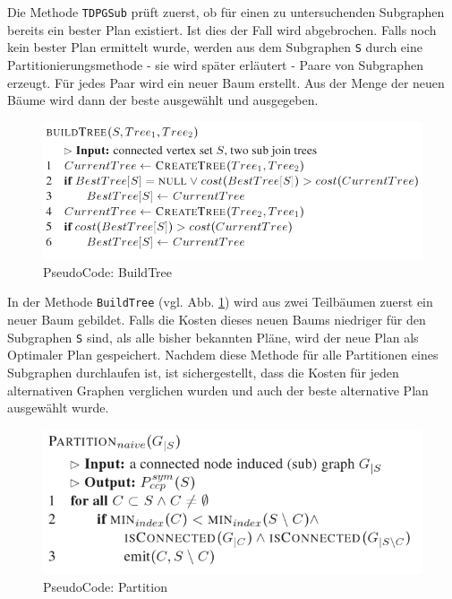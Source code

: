 Die Methode \texttt{TDPGSub} prüft zuerst, ob für einen zu untersuchenden Subgraphen bereits ein bester Plan existiert. Ist dies der Fall wird abgebrochen. Falls noch kein bester Plan ermittelt wurde, werden aus dem Subgraphen \texttt{S} durch eine Partitionierungsmethode - sie wird später erläutert - Paare von Subgraphen erzeugt. Für jedes Paar wird ein neuer Baum erstellt. Aus der Menge der neuen Bäume wird dann der beste ausgewählt und ausgegeben. 


\begin{figure}[ht]
  \centering
  \includegraphics[scale=0.4]{03_Regeln/00_media/BuildTree.png}
  \caption{PseudoCode: BuildTree}
  \label{BuildTree}
\end{figure}

In der Methode \texttt{BuildTree} (vgl. Abb. \ref{BuildTree}) wird aus zwei Teilbäumen zuerst ein neuer Baum gebildet. Falls die Kosten dieses neuen Baums niedriger für den Subgraphen \texttt{S} sind,  als alle bisher bekannten Pläne, wird der neue Plan als Optimaler Plan gespeichert. Nachdem diese Methode für alle Partitionen eines Subgraphen durchlaufen ist, ist sichergestellt, dass die Kosten für jeden alternativen Graphen verglichen wurden und auch der beste alternative Plan ausgewählt wurde.

\begin{figure}[ht]
  \centering
  \includegraphics[scale=0.4]{03_Regeln/00_media/Partition.png}
  \caption{PseudoCode: Partition}
  \label{Partition}
\end{figure}


